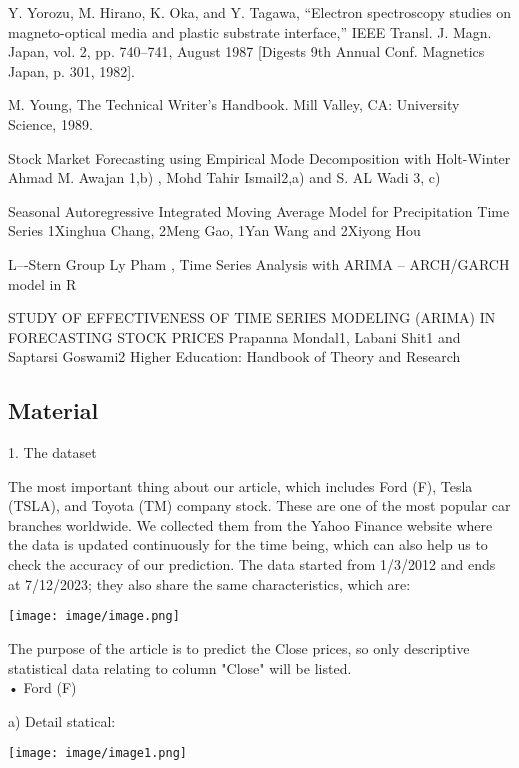 \documentclass{ieeeojies}
\begin{document}
Y. Yorozu, M. Hirano, K. Oka, and Y. Tagawa, “Electron spectroscopy
studies on magneto-optical media and plastic substrate interface,” IEEE
Transl. J. Magn. Japan, vol. 2, pp. 740–741, August 1987 [Digests 9th
Annual Conf. Magnetics Japan, p. 301, 1982].

 M. Young, The Technical Writer’s Handbook. Mill Valley, CA:
University Science, 1989.

Stock Market Forecasting using Empirical Mode 
Decomposition with Holt-Winter
Ahmad M. Awajan 1,b) , Mohd Tahir Ismail2,a) and S. AL Wadi 3, c)

Seasonal Autoregressive Integrated Moving Average Model for 
Precipitation Time Series 
1Xinghua Chang, 2Meng Gao, 1Yan Wang and 2Xiyong Hou

L--‐Stern Group Ly Pham , Time Series Analysis with ARIMA – ARCH/GARCH model in R

STUDY OF EFFECTIVENESS OF TIME SERIES MODELING (ARIMA) IN FORECASTING STOCK PRICES 
Prapanna Mondal1, Labani Shit1 and Saptarsi Goswami2
Higher Education: Handbook of Theory and Research
\subsection{Material}

1. The dataset

\hspace{0.3cm} The most important thing about our article, which includes Ford (F), Tesla (TSLA), and Toyota (TM) company stock. These are one of the most popular car branches worldwide. We collected them from the Yahoo Finance website where the data is updated continuously for the time being, which can also help us to check the accuracy of our prediction. The data started from 1/3/2012 and ends at 7/12/2023; they also share the same characteristics, which are:


\begin{center}
    \texttt{[image: image/image.png]}
\end{center}

The purpose of the article is to predict the Close prices, so only descriptive statistical data relating to column "Close" will be listed.
\\
•	Ford (F)

\hspace{0.5cm}a)	Detail statical: 

\begin{center}
    \texttt{[image: image/image1.png]}
\end{center}
\end{document}
